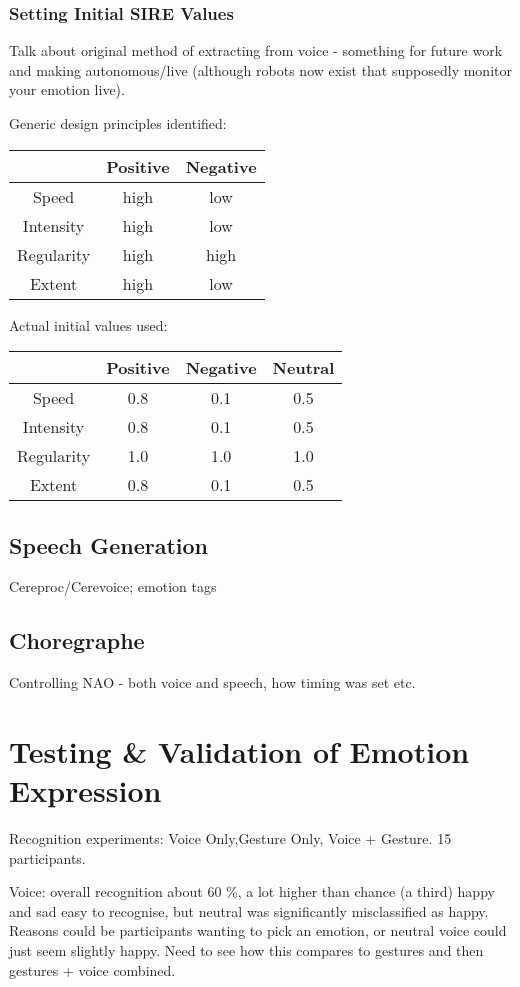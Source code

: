 \documentclass[11pt,a4paper]{report}
\begin{document}
\subsubsection{Setting Initial SIRE Values}
Talk about original method of extracting from voice - something for future work and making autonomous/live (although robots now exist that supposedly monitor your emotion live).

Generic design principles identified:

\begin{tabular}{|c|c|c|}
\hline & Positive & Negative \\ 
\hline Speed & high & low \\ 
\hline Intensity & high & low \\ 
\hline Regularity & high & high \\ 
\hline Extent & high & low \\ 
\hline 
\end{tabular} 

Actual initial values used:

\begin{tabular}{|c|c|c|c|}
\hline & Positive & Negative & Neutral \\ 
\hline Speed & 0.8 & 0.1 & 0.5\\ 
\hline Intensity & 0.8 & 0.1 & 0.5 \\ 
\hline Regularity & 1.0 & 1.0 & 1.0 \\ 
\hline Extent & 0.8 & 0.1 & 0.5\\ 
\hline 
\end{tabular} 

\subsection{Speech Generation}
Cereproc/Cerevoice; emotion tags

\subsection{Choregraphe}
Controlling NAO - both voice and speech, how timing was set etc.

\section{Testing \& Validation of Emotion Expression}
Recognition experiments: Voice Only,Gesture Only, Voice + Gesture. 15 participants.

Voice: overall recognition about 60 \%, a lot higher than chance (a third) happy and sad easy to recognise, but neutral was significantly misclassified as happy. Reasons could be participants wanting to pick an emotion, or neutral voice could just seem slightly happy. Need to see how this compares to gestures and then gestures + voice combined.
\end{document}
